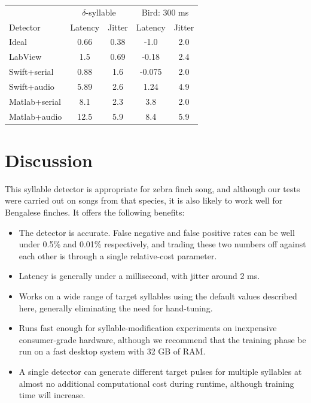 \documentclass[10pt,letterpaper]{article}
\begin{document}
\vspace{8pt}
\begin{tabular}{l|c|c|c| c}
  & \multicolumn{2}{c}{$\delta$-syllable} & \multicolumn{2}{c}{Bird: 300 ms} \\
  Detector & Latency & Jitter & Latency & Jitter \\
  \hline
  Ideal & 0.66 & 0.38 & -1.0 & 2.0 \\
  LabView & 1.5 & 0.69 & -0.18 & 2.4 \\
  Swift+serial & 0.88 & 1.6 & -0.075 & 2.0 \\
  Swift+audio & 5.89 & 2.6 & 1.24 & 4.9 \\
  Matlab+serial & 8.1 & 2.3 & 3.8 & 2.0 \\
  Matlab+audio & 12.5 & 5.9 & 8.4 & 5.9
\end{tabular}

\vspace{8pt}

\section{Discussion}
\label{sec:conclusion}

This syllable detector is appropriate for zebra finch song, and although our tests were carried out on songs from that species, it is also likely to work well for Bengalese finches.  It offers the following benefits:
\begin{itemize}
\item The detector is accurate. False negative and
  false positive rates can be well under 0.5\% and 0.01\% respectively, and trading these two numbers off against each other is through a single relative-cost parameter.
\item Latency is generally under a millisecond, with jitter around 2 ms.
\item Works on a wide range of target syllables using the default values described here, generally eliminating the need for hand-tuning.
\item Runs fast enough for syllable-modification experiments on inexpensive consumer-grade hardware, although we recommend that the training phase be run on a fast desktop system with 32 GB of RAM.
\item A single detector can generate different target pulses for multiple syllables at almost no additional computational cost during runtime, although training time will increase.
\end{itemize}
\end{document}
